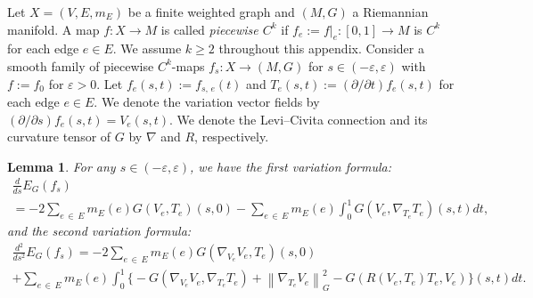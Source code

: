 \documentclass[11pt]{article}
\newtheorem{lemm}[theo]{Lemma}
\theoremstyle{definition}
\numberwithin{equation}{section}
\newcommand{\e}{\varepsilon}
\renewcommand{\epsilon}{\varepsilon}
\newcommand{\p}{\psi}
\renewcommand*\p{\partial}
\begin{document}
Let $X=(V, E, m_E)$ be a finite weighted graph and $(M, G)$ a Riemannian manifold. A map $f: X\to M$ is called \emph{piecewise $C^k$} if $f_{e}:=f|_e: [0,1]\to M$ is $C^k$ for each edge $e\in E$. We assume $k\geq 2$ throughout this appendix. Consider a smooth family of piecewise $C^k$-maps $f_{s}: X \to (M, G)$ for $s\in (-\epsilon, \epsilon)$ with $f:=f_{0}$ for $\e>0$. Let $f_e(s, t):=f_{s,\,e} (t)$ and $T_e(s, t):=(\p/\p t)f_e(s, t)$ for each edge $e\in E$. We denote the variation vector fields by $(\p/\p s)f_e(s, t)=V_e(s, t)$. We denote the Levi--Civita connection and its curvature tensor of $G$ by $\nabla$ and $R$, respectively.


\begin{lemm}\label{Lem:first and second}
For any $s \in (-\e, \e)$, we have the first variation formula:
\begin{multline}\label{Eq:firstVF}
\frac{d}{d s} E_G(f_{s})\\
=-2\sum_{e\,\in\,E}m_E(e)G(V_e, T_e)(s,0)-\sum_{e\,\in\,E}m_E(e)\int_0^1 G\left(V_e, \nabla_{T_e}T_e\right)(s,t) dt,
\end{multline}
and the second variation formula:
\begin{multline}\label{Eq:secondVF}
\frac{d^2}{d s^2} E_G(f_{s})=-2\sum_{e\,\in\,E}m_E(e)G\left(\nabla_{V_e} V_e, T_e\right)(s,0)\\
+\sum_{e\,\in\,E}m_E(e) \int_0^1 \big\{-G\left(\nabla_{V_e}V_e, \nabla_{T_e}T_e\right)+\left\|\nabla_{T_e}V_e\right\|_G^2 -G\left(R\left(V_e, T_e\right)T_e, V_e\right) \big\}(s, t)dt.
\end{multline}
\end{lemm}
\end{document}
